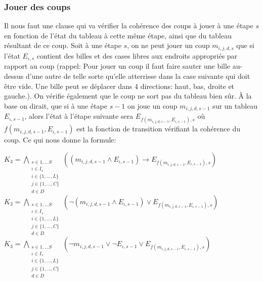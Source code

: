 \documentclass[utf8]{article}
\begin{document}
\subsubsection{Jouer des coups}
Il nous faut une clause qui va vérifier la cohérence des coups à jouer à une étape $s$ en fonction de l'état du tableau à cette même étape, ainsi que du tableau résultant de ce coup. Soit à une étape $s$, on ne peut jouer un coup $m_{i,j,d,s}$ que si l'état $E_{\iota,s}$ contient des billes et des cases libres aux endroits appropriés par rapport au coup (rappel: Pour jouer un coup il faut faire sauter une bille au-dessus d'une autre de telle sorte qu'elle atterrisse dans la case suivante qui doit être vide. Une bille peut se déplacer dans 4 directions: haut, bas, droite et gauche.). On vérifie également que le coup ne sort pas du tableau bien sûr.\newline
À la base on dirait, que si à une étape $s-1$ on joue un coup $m_{i,j,d,s-1}$ sur un tableau $E_{\iota,s-1}$, alors l'état à l'étape suivante sera $E_{f(m_{i,j,d,s-1},E_{\iota,s-1}),s}$ où $f(m_{i,j,d,s-1},E_{\iota,s-1})$ est la fonction de transition vérifiant la cohérence du coup. Ce qui nous donne la formule: \newline

$K_3 = {\underset{\substack{s\in{1,...S}\\\iota\in I_s\\i\in\{1,...,L\}\\j \in\{1,...,C\}\\d \in D}}{\bigwedge}}((m_{i,j,d,s-1}\wedge E_{\iota,s-1})\rightarrow E_{f(m_{i,j,d,s-1},E_{\iota,s-1}),s})$ \newline
$K_3 = {\underset{\substack{s\in{1,...S}\\\iota\in I_s\\i\in\{1,...,L\}\\j \in\{1,...,C\}\\d \in D}}{\bigwedge}}(\neg(m_{i,j,d,s-1}\wedge E_{\iota,s-1})\vee E_{f(m_{i,j,d,s-1},E_{\iota,s-1}),s})$ \newline
$K_3 = {\underset{\substack{s\in{1,...S}\\\iota\in I_s\\i\in\{1,...,L\}\\j \in\{1,...,C\}\\d \in D}}{\bigwedge}}(\neg m_{i,j,d,s-1}\vee \neg E_{\iota,s-1}\vee E_{f(m_{i,j,d,s-1},E_{\iota,s-1}),s})$
\newpage
\end{document}
